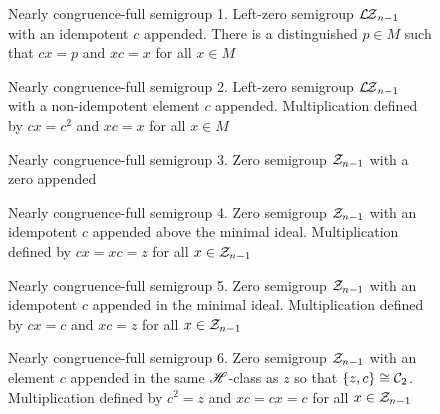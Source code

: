 \begin{figure}[p]
  \centering
  
  \caption[Nearly congruence-full semigroup 1]{Nearly congruence-full semigroup
    1.  Left-zero semigroup $\mathcal{L\!Z}_{n-1}$ with an idempotent $c$ appended.  There
    is a distinguished $p \in M$ such that $cx=p$ and $xc=x$ for all $x \in M$}
  \label{fig:nearfull-1}
\end{figure}

\begin{figure}[p]
  \centering
  
  \caption[Nearly congruence-full semigroup 2]{Nearly congruence-full semigroup
    2.  Left-zero semigroup $\mathcal{L\!Z}_{n-1}$ with a non-idempotent element $c$
    appended.  Multiplication defined by $cx=c^2$ and $xc=x$ for all $x \in M$}
  \label{fig:nearfull-2}
\end{figure}

\begin{figure}[p]
  \centering
  
  \caption[Nearly congruence-full semigroup 3]{Nearly congruence-full semigroup
    3.  Zero semigroup $\mathcal{Z}_{n-1}$ with a zero appended}
  \label{fig:nearfull-3}
\end{figure}

\begin{figure}[p]
  \centering
  
  \caption[Nearly congruence-full semigroup 4]{Nearly congruence-full semigroup
    4.  Zero semigroup $\mathcal{Z}_{n-1}$ with an idempotent $c$ appended above the
    minimal ideal.  Multiplication defined by $cx=xc=z$ for all
    $x \in \mathcal{Z}_{n-1}$}
  \label{fig:nearfull-4}
\end{figure}

\begin{figure}[p]
  \centering
  
  \caption[Nearly congruence-full semigroup 5]{Nearly congruence-full semigroup
    5.  Zero semigroup $\mathcal{Z}_{n-1}$ with an idempotent $c$ appended in the minimal
    ideal.  Multiplication defined by $cx=c$ and $xc=z$ for all
    $x \in \mathcal{Z}_{n-1}$}
  \label{fig:nearfull-5}
\end{figure}

\begin{figure}[p]
  \centering
  
  \caption[Nearly congruence-full semigroup 6]{Nearly congruence-full semigroup
    6.  Zero semigroup $\mathcal{Z}_{n-1}$ with an element $c$ appended in the same
    $\mathrel{\mathscr{H}}$-class as $z$ so that $\{z,c\} \cong \mathcal{C}_2$.  Multiplication defined
    by $c^2=z$ and $xc=cx=c$ for all $x \in \mathcal{Z}_{n-1}$}
  \label{fig:nearfull-6}
\end{figure}

